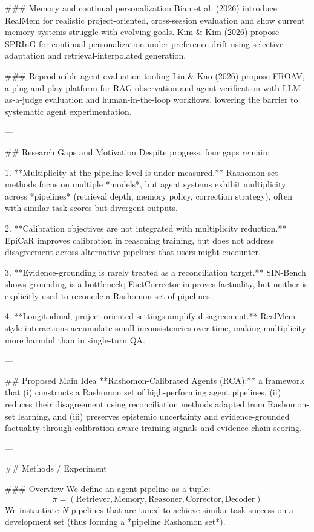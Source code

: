 ### Memory and continual personalization  
Bian et al. (2026) introduce RealMem for realistic project-oriented, cross-session evaluation and show current memory systems struggle with evolving goals. Kim & Kim (2026) propose SPRInG for continual personalization under preference drift using selective adaptation and retrieval-interpolated generation.

### Reproducible agent evaluation tooling  
Lin & Kao (2026) propose FROAV, a plug-and-play platform for RAG observation and agent verification with LLM-as-a-judge evaluation and human-in-the-loop workflows, lowering the barrier to systematic agent experimentation.

---

## Research Gaps and Motivation  
Despite progress, four gaps remain:

1. **Multiplicity at the pipeline level is under-measured.** Rashomon-set methods focus on multiple *models*, but agent systems exhibit multiplicity across *pipelines* (retrieval depth, memory policy, correction strategy), often with similar task scores but divergent outputs.

2. **Calibration objectives are not integrated with multiplicity reduction.** EpiCaR improves calibration in reasoning training, but does not address disagreement across alternative pipelines that users might encounter.

3. **Evidence-grounding is rarely treated as a reconciliation target.** SIN-Bench shows grounding is a bottleneck; FactCorrector improves factuality, but neither is explicitly used to reconcile a Rashomon set of pipelines.

4. **Longitudinal, project-oriented settings amplify disagreement.** RealMem-style interactions accumulate small inconsistencies over time, making multiplicity more harmful than in single-turn QA.

---

## Proposed Main Idea  
**Rashomon-Calibrated Agents (RCA):** a framework that (i) constructs a Rashomon set of high-performing agent pipelines, (ii) reduces their disagreement using reconciliation methods adapted from Rashomon-set learning, and (iii) preserves epistemic uncertainty and evidence-grounded factuality through calibration-aware training signals and evidence-chain scoring.

---

## Methods / Experiment  

### Overview  
We define an agent pipeline as a tuple:  
\[
\pi = (\text{Retriever}, \text{Memory}, \text{Reasoner}, \text{Corrector}, \text{Decoder})
\]
We instantiate \(N\) pipelines that are tuned to achieve similar task success on a development set (thus forming a *pipeline Rashomon set*).

